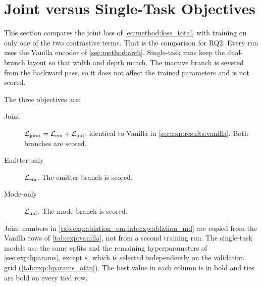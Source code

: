 \section{Joint versus Single-Task Objectives}\label{sec:exp:ablation}

This section compares the joint loss of \cref{eq:method:loss_total} with training on only one of the two contrastive terms.
That is the comparison for RQ2.
Every run uses the Vanilla encoder of \cref{sec:method:arch}.
Single-task runs keep the dual-branch layout so that width and depth match.
The inactive branch is severed from the backward pass, so it does not affect the trained parameters and is not scored.

The three objectives are:
\begin{description}
  \item[Joint] $\mathcal{L}_{\mathrm{joint}} = \mathcal{L}_{\mathrm{em}} + \mathcal{L}_{\mathrm{md}}$, identical to Vanilla in \cref{sec:exp:results:vanilla}. Both branches are scored.
  \item[Emitter-only] $\mathcal{L}_{\mathrm{em}}$. The emitter branch is scored.
  \item[Mode-only] $\mathcal{L}_{\mathrm{md}}$. The mode branch is scored.
\end{description}

Joint numbers in \cref{tab:exp:ablation_em,tab:exp:ablation_md} are copied from the Vanilla rows of \cref{tab:exp:vanilla}, not from a second training run.
The single-task models use the same splits and the remaining hyperparameters of \cref{sec:exp:hparams}, except $\varepsilon$, which is selected independently on the validation grid (\cref{tab:exp:hparams_attn}).
The best value in each column is in bold and ties are bold on every tied row.

\begin{table}[tbp]
  \centering
  \caption{Emitter clustering for joint versus single-task objectives on the Vanilla encoder.}
  \label{tab:exp:ablation_em}
  \small
\end{table}

